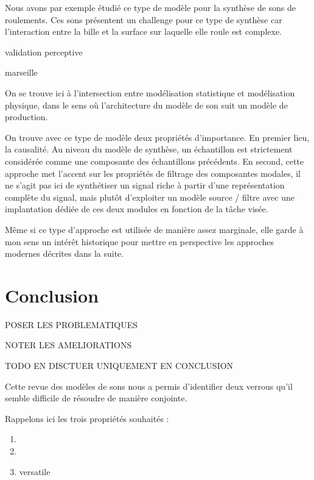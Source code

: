 Nous avons par exemple étudié ce type de modèle pour la synthèse de sons de roulements. Ces sons présentent un challenge pour ce type de synthèse car l'interaction entre la bille et la surface sur laquelle elle roule est complexe.

 \cite{LagrangeTasslp10}

 validation perceptive

 \cite{Murphy11a}

marseille \cite{conan2014synthesis}

On se trouve ici à l'intersection entre modélisation statistique et modélisation physique, dans le sens où l'architecture du modèle de son suit un modèle de production.



On trouve avec ce type de modèle deux propriétés d'importance. En premier lieu, la causalité. Au niveau du modèle de synthèse, un échantillon est strictement considérée comme une composante des échantillons précédents.  En second, cette approche met l'accent sur les propriétés de filtrage des composantes modales, il ne s'agit pas ici de synthétiser un signal riche à partir d'une représentation complète du signal, mais plutôt d'exploiter un modèle source / filtre avec une implantation dédiée de ces deux modules en fonction de la tâche visée.

Même si ce type d'approche est utilisée de manière assez marginale, elle garde à mon sens un intérêt historique pour mettre en perspective les approches modernes décrites dans la suite.


\section{ \nmu Conclusion}

POSER LES PROBLEMATIQUES

NOTER LES AMELIORATIONS






TODO EN DISCTUER UNIQUEMENT EN CONCLUSION

Cette revue des modèles de sons nous a permis d'identifier deux verrous qu'il semble difficile de résoudre de manière conjointe.

Rappelons ici les trois propriétés souhaités :
\begin{enumerate}
  \item
  \item
  \item versatile
\end{enumerate}

